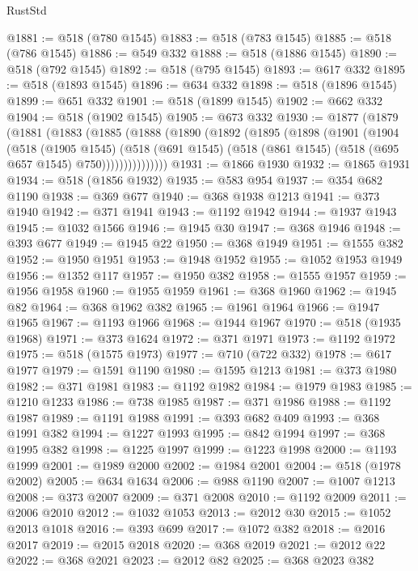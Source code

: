 \begin{lexlean}{RustStd}
\begin{coremodule}
@1881 := @518 (@780 @1545)
@1883 := @518 (@783 @1545)
@1885 := @518 (@786 @1545)
@1886 := @549 @332
@1888 := @518 (@1886 @1545)
@1890 := @518 (@792 @1545)
@1892 := @518 (@795 @1545)
@1893 := @617 @332
@1895 := @518 (@1893 @1545)
@1896 := @634 @332
@1898 := @518 (@1896 @1545)
@1899 := @651 @332
@1901 := @518 (@1899 @1545)
@1902 := @662 @332
@1904 := @518 (@1902 @1545)
@1905 := @673 @332
@1930 := @1877
    (@1879
      (@1881
        (@1883
          (@1885
            (@1888
              (@1890
                (@1892
                  (@1895
                    (@1898
                      (@1901
                        (@1904
                          (@518
                            (@1905 @1545)
                            (@518
                              (@691 @1545)
                              (@518 (@861 @1545) (@518 (@695 @657 @1545) @750)))))))))))))))
@1931 := @1866 @1930
@1932 := @1865 @1931
@1934 := @518 (@1856 @1932)
@1935 := @583 @954
@1937 := @354 @682 @1190
@1938 := @369 @677
@1940 := @368 @1938 @1213
@1941 := @373 @1940
@1942 := @371 @1941
@1943 := @1192 @1942
@1944 := @1937 @1943
@1945 := @1032 @1566
@1946 := @1945 @30
@1947 := @368 @1946
@1948 := @393 @677
@1949 := @1945 @22
@1950 := @368 @1949
@1951 := @1555 @382
@1952 := @1950 @1951
@1953 := @1948 @1952
@1955 := @1052 @1953 @1949
@1956 := @1352 @117
@1957 := @1950 @382
@1958 := @1555 @1957
@1959 := @1956 @1958
@1960 := @1955 @1959
@1961 := @368 @1960
@1962 := @1945 @82
@1964 := @368 @1962 @382
@1965 := @1961 @1964
@1966 := @1947 @1965
@1967 := @1193 @1966
@1968 := @1944 @1967
@1970 := @518 (@1935 @1968)
@1971 := @373 @1624
@1972 := @371 @1971
@1973 := @1192 @1972
@1975 := @518 (@1575 @1973)
@1977 := @710 (@722 @332)
@1978 := @617 @1977
@1979 := @1591 @1190
@1980 := @1595 @1213
@1981 := @373 @1980
@1982 := @371 @1981
@1983 := @1192 @1982
@1984 := @1979 @1983
@1985 := @1210 @1233
@1986 := @738 @1985
@1987 := @371 @1986
@1988 := @1192 @1987
@1989 := @1191 @1988
@1991 := @393 @682 @409
@1993 := @368 @1991 @382
@1994 := @1227 @1993
@1995 := @842 @1994
@1997 := @368 @1995 @382
@1998 := @1225 @1997
@1999 := @1223 @1998
@2000 := @1193 @1999
@2001 := @1989 @2000
@2002 := @1984 @2001
@2004 := @518 (@1978 @2002)
@2005 := @634 @1634
@2006 := @988 @1190
@2007 := @1007 @1213
@2008 := @373 @2007
@2009 := @371 @2008
@2010 := @1192 @2009
@2011 := @2006 @2010
@2012 := @1032 @1053
@2013 := @2012 @30
@2015 := @1052 @2013 @1018
@2016 := @393 @699
@2017 := @1072 @382
@2018 := @2016 @2017
@2019 := @2015 @2018
@2020 := @368 @2019
@2021 := @2012 @22
@2022 := @368 @2021
@2023 := @2012 @82
@2025 := @368 @2023 @382

\end{coremodule}
\end{lexlean}
